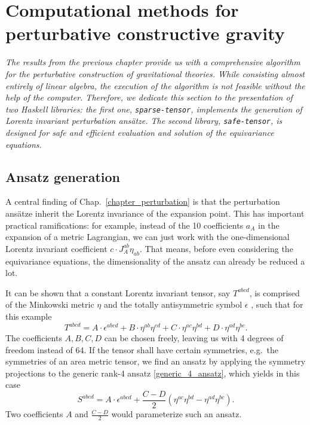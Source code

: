 \chapter{Computational methods for perturbative constructive gravity}
\label{chapter_computational_methods}

\textit{The results from the previous chapter provide us with a comprehensive algorithm for the perturbative construction of gravitational theories. While consisting almost entirely of linear algebra, the execution of the algorithm is not feasible without the help of the computer. Therefore, we dedicate this section to the presentation of two Haskell libraries: the first one, \texttt{sparse-tensor}, implements the generation of Lorentz invariant perturbation ansätze. The second library, \texttt{safe-tensor}, is designed for safe and efficient evaluation and solution of the equivariance equations.}

\section{Ansatz generation}
A central finding of Chap.~\ref{chapter_perturbation} is that the perturbation ansätze inherit the Lorentz invariance of the expansion point. This has important practical ramifications: for example, instead of the 10 coefficients $a_A$ in the expansion of a metric Lagrangian, we can just work with the one-dimensional Lorentz invariant coefficient $c\cdot J_A^{ab} \eta_{ab}$. That means, before even considering the equivariance equations, the dimensionality of the ansatz can already be reduced a lot.

It can be shown that a constant Lorentz invariant tensor, say $T^{abcd}$, is comprised of the Minkowski metric $\eta$ and the totally antisymmetric symbol $\epsilon$ \cite{}, such that for this example
\begin{equation}\label{generic_4_ansatz}
  T^{abcd} = A \cdot \epsilon^{abcd} + B \cdot \eta^{ab} \eta^{cd} + C \cdot \eta^{ac} \eta^{bd} + D \cdot \eta^{ad} \eta^{bc}.
\end{equation}
The coefficients $A,B,C,D$ can be chosen freely, leaving us with 4 degrees of freedom instead of 64. If the tensor shall have certain symmetries, e.g.\ the symmetries of an area metric tensor, we find an ansatz by applying the symmetry projections to the generic rank-4 ansatz \eqref{generic_4_ansatz}, which yields in this case
\begin{equation}
  S^{abcd} = A \cdot \epsilon^{abcd} + \frac{C - D}{2} \left( \eta^{ac}\eta^{bd} - \eta^{ad}\eta^{bc} \right).
\end{equation}
Two coefficients $A$ and $\frac{C-D}{2}$ would parameterize such an ansatz.

